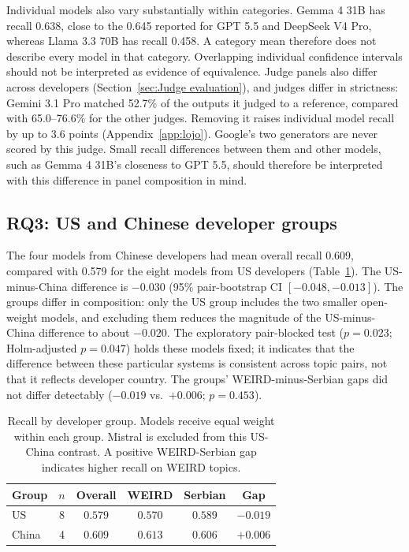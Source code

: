\documentclass[11pt,a4paper]{article}
\begin{document}
Individual models also vary substantially within categories. Gemma 4 31B has recall 0.638, close to the 0.645 reported for GPT 5.5 and DeepSeek V4 Pro, whereas Llama 3.3 70B has recall 0.458. A category mean therefore does not describe every model in that category. Overlapping individual confidence intervals should not be interpreted as evidence of equivalence. Judge panels also differ across developers (Section~\ref{sec:Judge evaluation}), and judges differ in strictness: Gemini 3.1 Pro matched 52.7\% of the outputs it judged to a reference, compared with 65.0--76.6\% for the other judges. Removing it raises individual model recall by up to 3.6 points (Appendix~\ref{app:lojo}). Google's two generators are never scored by this judge. Small recall differences between them and other models, such as Gemma 4 31B's closeness to GPT 5.5, should therefore be interpreted with this difference in panel composition in mind.

\subsection{RQ3: US and Chinese developer groups}
\label{sec:rq3}
The four models from Chinese developers had mean overall recall 0.609, compared with 0.579 for the eight models from US developers (Table~\ref{tab:origin-recall}). The US-minus-China difference is $-0.030$ (95\% pair-bootstrap CI $[-0.048,-0.013]$). The groups differ in composition: only the US group includes the two smaller open-weight models, and excluding them reduces the magnitude of the US-minus-China difference to about $-0.020$. The exploratory pair-blocked test ($p=0.023$; Holm-adjusted $p=0.047$) holds these models fixed; it indicates that the difference between these particular systems is consistent across topic pairs, not that it reflects developer country. The groups' WEIRD-minus-Serbian gaps did not differ detectably ($-0.019$ vs.\ $+0.006$; $p=0.453$).

\begin{table}[!htbp]
\centering
\small
\caption{Recall by developer group. Models receive equal weight within each group. Mistral is excluded from this US-China contrast. A positive WEIRD-Serbian gap indicates higher recall on WEIRD topics.}
\label{tab:origin-recall}
\setlength{\tabcolsep}{3pt}
\begin{tabular*}{\columnwidth}{@{\extracolsep{\fill}}lccccc@{}}
\toprule
Group & $n$ & Overall & WEIRD & Serbian & Gap\\
\midrule
US & 8 & $0.579$ & $0.570$ & $0.589$ & $-0.019$\\
China & 4 & $0.609$ & $0.613$ & $0.606$ & $+0.006$\\
\bottomrule
\end{tabular*}
\end{table}
\end{document}
